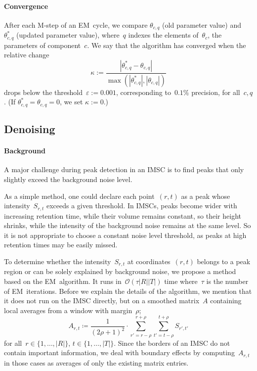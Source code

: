 \documentclass{article}
\begin{document}
\paragraph{Convergence}
After each M-step of an EM~cycle, we compare $\theta_{c,q}$ (old parameter value) and $\theta^*_{c,q}$ (updated parameter value), where~$q$ indexes the elements of~$\theta_c$, the parameters of component~$c$.
We say that the algorithm has converged when the relative change
\[
\kappa  :=
\frac{|\theta_{c,q}^*  - \theta_{c,q}|}{\max \left( |\theta_{c,q}^*|,|\theta_{c,q}| \right)}
\]
drops below the threshold~$\varepsilon:=0.001$, corresponding to~$0.1\%$ precision, for all~$c,q$.
(If $\theta_{c,q}^* = \theta_{c,q} = 0$, we set $\kappa := 0$.)

\subsection{Denoising}
\label{sec:denoising}

\paragraph*{Background}
A major challenge during peak detection in an IMSC is to find peaks that only slightly exceed the background noise level.

As a simple method, one could declare each point~$(r,t)$ as a peak whose intensity~$S_{r,t}$ exceeds a given threshold.
In IMSCs, peaks become wider with increasing retention time, while their volume remains constant, so their height shrinks, while the intensity of the background noise remains at the same level.
So it is not appropriate to choose a constant noise level threshold, as peaks at high retention times may be easily missed.

To determine whether the intensity~$S_{r,t}$ at coordinates~$(r,t)$ belongs to a peak region or can be solely explained by background noise, we propose a method based on the EM~algorithm.
It runs in~$\mathcal{O}(\tau |R||T|)$ time where~$\tau$ is the number of EM~iterations.
Before we explain the details of the algorithm, we mention that it does not run on the IMSC directly, but on a smoothed matrix~$A$ containing local averages from a window with margin~$\rho$;
\begin{equation*}
	A_{r, t} \coloneq \frac{1}{(2\rho+1)^2} \cdot \sum\limits_{r' = r - \rho}^{r + \rho} \sum\limits_{t' = t - \rho}^{t + \rho} S_{r', t'}
\end{equation*}
for all~$r\in\{1,\dots,|R|\}$, $t\in\{1,\dots,|T|\}$.
Since the borders of an IMSC do not contain important information, we deal with boundary effects by computing~$A_{r,t}$ in those cases as averages of only the existing matrix entries.
\end{document}

